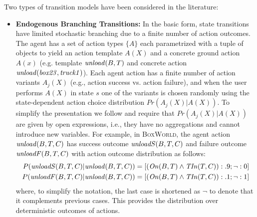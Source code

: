 %
Two types of transition models have been considered in the literature:
\begin{itemize}
\item {\bf Endogenous Branching Transitions:} In the basic form, state transitions
  have limited stochastic branching due to a finite number of action
  outcomes.  The agent has a set of action types $\{A\}$ each
  parametrized with a tuple of objects to yield an action template
  $A(X)$ and a concrete ground action $A(x)$ (e.g. template
  $\mathit{unload}(B,T)$ and concrete action
  $\mathit{unload}(\mathit{box23},\mathit{truck1})$). 
  Each agent action has a finite number of action
  variants $A_j(X)$ (e.g., action success vs. action failure), and
  when the user performs $A(X)$ in state $s$ one of the variants is
  chosen randomly using the state-dependent action choice distribution
  $Pr(A_j(X) | A(X))$.  
    To simplify the presentation we follow
\cite{WangJoKh08,JoshiKeKh11} and require that $Pr(A_j(X)|A(X))$ are given by open expressions, i.e., they have no aggregations and cannot introduce new
variables.  For example, in \textsc{BoxWorld}, the agent
  action $\mathit{unload}(B,T,C)$ has success outcome $\mathit{unloadS}(B,T,C)$ and
  failure outcome $\mathit{unloadF}(B,T,C)$ with action outcome distribution
  as follows:
%
%
%
%
%
\begin{align}
  P(\mathit{unloadS}(B,T,C) | \mathit{unload}(B,T,C)) & = [(\mathit{On}(B,T) \wedge \mathit{TIn}(T,C)): .9; \neg: 0] \nonumber \\
  P(\mathit{unloadF}(B,T,C) | \mathit{unload}(B,T,C)) & = [(\mathit{On}(B,T) \wedge \mathit{TIn}(T,C)): .1; \neg: 1]
   \label{eq:stoch_act_ex} 
\end{align}
where, to simplify the notation, the last case is shortened as $\neg$ to denote that it complements previous cases.
This provides the distribution over deterministic outcomes of 
actions.


\end{itemize}
